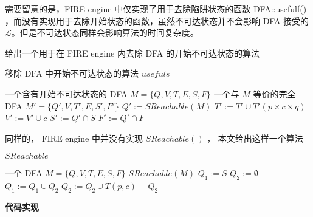 需要留意的是，FIRE engine 中仅实现了用于去除陷阱状态的函数 DFA::usefulf() ，而没有实现用于去除开始状态的函数，虽然不可达状态并不会影响 DFA 接受的 $\mathcal{L} $。但是不可达状态同样会影响算法的时间复杂度。

给出一个用于在 FIRE engine 内去除 DFA 的开始不可达状态的算法

\begin{algorithm}
    \caption{ 移除 DFA 中开始不可达状态的算法 $usefuls$ }\label{al:usefuls}
    \begin{algorithmic}[1]
        \Require 一个含有开始不可达状态的 DFA $M=\{Q,V,T,E,S,F\}$
        \Ensure 一个与 $M$ 等价的完全 DFA $M'=\{Q',V,T',E,S',F'\}$
        \Statex {}
            \State $Q' := SReachable(M) $
                        \State $ T' := T' \cup T'(p\times c \times q) $
                        \State $ V' := V' \cup c $
                    \EndIf
                \EndFor
            \EndFor
            \State $S':=Q' \cap S$
            \State $F':=Q' \cap F$
        \EndFunction
    \end{algorithmic}
\end{algorithm}

同样的， FIRE engine 中并没有实现 $SReachable()$ ， 本文给出这样一个算法

\begin{algorithm}
    \caption{ $SReachable$ }\label{al:SReachable}
    \small%
    \begin{algorithmic}[1]
        \Require 一个 DFA $M=\{Q,V,T,E,S,F\}$
        \Ensure $SReachable(M)$
        \Statex %
            \State $ Q_1 := S $
            \State $ Q_2 := \emptyset $
            \Repeat
                \State $Q_1 := Q_1 \cup Q_2 $
                            $ Q_2 := Q_2 \cup T(p,c)  $
                        \EndIf
                    \EndFor
                \EndFor
             {~~$Q_2$}
        \EndFunction
    \end{algorithmic}
\end{algorithm}

{\bfseries 代码实现}

